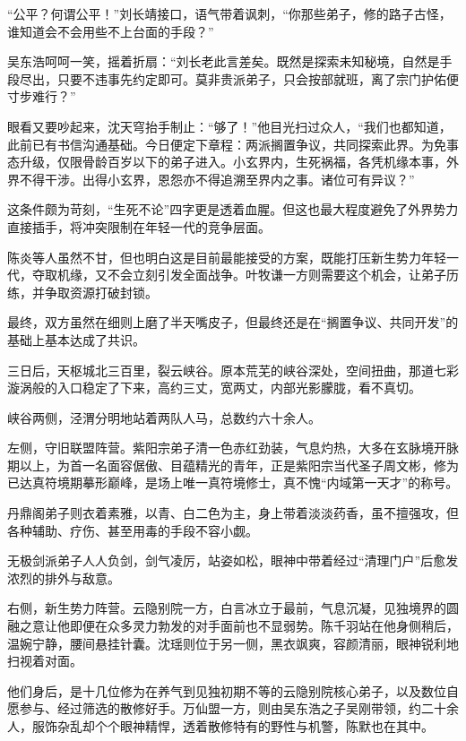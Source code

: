 “公平？何谓公平！”刘长靖接口，语气带着讽刺，“你那些弟子，修的路子古怪，谁知道会不会用些不上台面的手段？”

吴东浩呵呵一笑，摇着折扇：“刘长老此言差矣。既然是探索未知秘境，自然是手段尽出，只要不违事先约定即可。莫非贵派弟子，只会按部就班，离了宗门护佑便寸步难行？”

眼看又要吵起来，沈天穹抬手制止：“够了！”他目光扫过众人，“我们也都知道，此前已有书信沟通基础。今日便定下章程：两派搁置争议，共同探索此界。为免事态升级，仅限骨龄百岁以下的弟子进入。小玄界内，生死祸福，各凭机缘本事，外界不得干涉。出得小玄界，恩怨亦不得追溯至界内之事。诸位可有异议？”

这条件颇为苛刻，“生死不论”四字更是透着血腥。但这也最大程度避免了外界势力直接插手，将冲突限制在年轻一代的竞争层面。

陈炎等人虽然不甘，但也明白这是目前最能接受的方案，既能打压新生势力年轻一代，夺取机缘，又不会立刻引发全面战争。叶牧谦一方则需要这个机会，让弟子历练，并争取资源打破封锁。

最终，双方虽然在细则上磨了半天嘴皮子，但最终还是在“搁置争议、共同开发”的基础上基本达成了共识。

\vspace{2em}

三日后，天枢城北三百里，裂云峡谷。原本荒芜的峡谷深处，空间扭曲，那道七彩漩涡般的入口稳定了下来，高约三丈，宽两丈，内部光影朦胧，看不真切。

峡谷两侧，泾渭分明地站着两队人马，总数约六十余人。

左侧，守旧联盟阵营。紫阳宗弟子清一色赤红劲装，气息灼热，大多在玄脉境开脉期以上，为首一名面容倨傲、目蕴精光的青年，正是紫阳宗当代圣子周文彬，修为已达真符境期摹形巅峰，是场上唯一真符境修士，真不愧“内域第一天才”的称号。

丹鼎阁弟子则衣着素雅，以青、白二色为主，身上带着淡淡药香，虽不擅强攻，但各种辅助、疗伤、甚至用毒的手段不容小觑。

无极剑派弟子人人负剑，剑气凌厉，站姿如松，眼神中带着经过“清理门户”后愈发浓烈的排外与敌意。

右侧，新生势力阵营。云隐别院一方，白言冰立于最前，气息沉凝，见独境界的圆融之意让他即便在众多灵力勃发的对手面前也不显弱势。陈千羽站在他身侧稍后，温婉宁静，腰间悬挂针囊。沈瑶则位于另一侧，黑衣飒爽，容颜清丽，眼神锐利地扫视着对面。

他们身后，是十几位修为在养气到见独初期不等的云隐别院核心弟子，以及数位自愿参与、经过筛选的散修好手。万仙盟一方，则由吴东浩之子吴刚带领，约二十余人，服饰杂乱却个个眼神精悍，透着散修特有的野性与机警，陈默也在其中。

